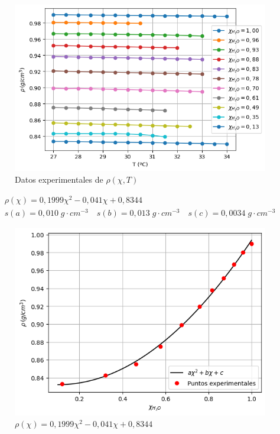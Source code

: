 \documentclass[a4paper,12pt,titlepage]{article}
\begin{document}
\begin{figure}[h!]
    \centering
    \includegraphics[width=0.85\linewidth]{Densidad/rho-T.png}
    \caption{Datos experimentales de $\rho(\chi,T)$}
    \label{fig:enter-label}
\end{figure}

\begin{equation}
    \begin{gathered}
        \rho(\chi) = 0,1999\chi^2 - 0,041\chi + 0,8344\\
        s(a) = 0,010 \; g\cdot cm^{-3} \quad s(b) = 0,013 \; g\cdot cm^{-3} \quad s(c)= 0,0034 \; g\cdot cm^{-3}
    \end{gathered}
\end{equation}

\begin{figure}[h!]
    \centering
    \includegraphics[width=0.85\linewidth]{Densidad/rho-x.png}
    \caption{$\rho(\chi) = 0,1999\chi^2 - 0,041\chi + 0,8344$}
    \label{fig:enter-label}
\end{figure}
\end{document}
